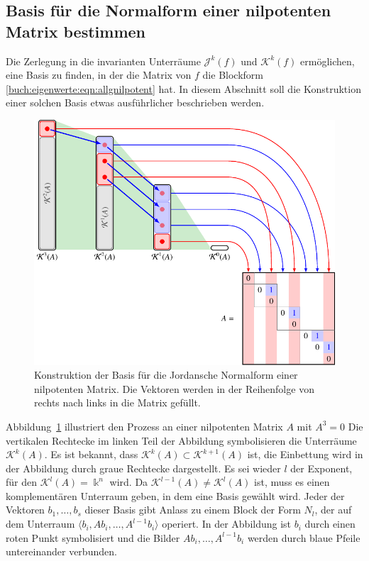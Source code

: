 %
%
\subsection{Basis für die Normalform einer nilpotenten Matrix bestimmen
\label{buch:subsection:normalform-einer-nilpotenten-matrix}}
Die Zerlegung in die invarianten Unterräume $\mathcal{J}^k(f)$ und
$\mathcal{K}^k(f)$ ermöglichen, eine Basis zu finden, in der die
Matrix von $f$ die Blockform \eqref{buch:eigenwerte:eqn:allgnilpotent}
hat.
In diesem Abschnitt soll die Konstruktion einer solchen Basis
etwas ausführlicher beschrieben werden.

\begin{figure}
\centering
\includegraphics{chapters/40-eigenwerte/images/normalform.pdf}
\caption{Konstruktion der Basis für die Jordansche Normalform einer
nilpotenten Matrix.
Die Vektoren werden in der Reihenfolge von rechts nach links in die
Matrix gefüllt.
\label{buch:eigenwerte:fig:normalform}}
\end{figure}

Abbildung~\ref{buch:eigenwerte:fig:normalform} illustriert den Prozess
an einer nilpotenten Matrix $A$ mit $A^3=0$
Die vertikalen Rechtecke im linken Teil der Abbildung symbolisieren
die Unterräume $\mathcal{K}^k(A)$.
Es ist bekannt, dass $\mathcal{K}^k(A) \subset \mathcal{K}^{k+1}(A)$ ist,
die Einbettung wird in der Abbildung durch graue Rechtecke dargestellt.
Es sei wieder $l$ der Exponent, für den $\mathcal{K}^l(A)=\Bbbk^n$ wird.
Da $\mathcal{K}^{l-1}(A)\ne \mathcal{K}^l(A)$ ist, muss es einen
komplementären Unterraum geben, in dem eine Basis gewählt wird.
Jeder der Vektoren $b_1,\dots,b_s$ dieser Basis gibt Anlass zu einem
Block der Form $N_l$, der auf dem Unterraum 
$\langle b_i,Ab_i,\dots,A^{l-1}b_i\rangle$ operiert.
In der Abbildung ist $b_i$ durch einen roten Punkt symbolisiert und
die Bilder $Ab_i,\dots,A^{l-1}b_i$ werden durch blaue Pfeile untereinander
verbunden.

